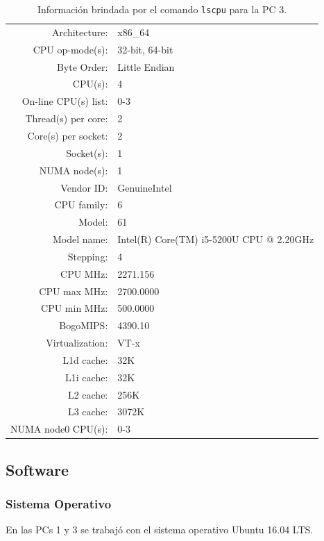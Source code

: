 \documentclass{article}
\begin{document}
\begin{description}[align=right]
        \begin{table}[H]
            \centering
            \begin{tabular}{ r l }
				Architecture:        &  x86\_64\\
				CPU op-mode(s):      &  32-bit, 64-bit\\
				Byte Order:          &  Little Endian\\
				CPU(s):              &  4\\
				On-line CPU(s) list: &  0-3\\
				Thread(s) per core:  &  2\\
				Core(s) per socket:  &  2\\
				Socket(s):           &  1\\
				NUMA node(s):        &  1\\
				Vendor ID:           &  GenuineIntel\\
				CPU family:          &  6\\
				Model:               &  61\\
				Model name:          &  Intel(R) Core(TM) i5-5200U CPU @ 2.20GHz\\
				Stepping:            &  4\\
				CPU MHz:             &  2271.156\\
				CPU max MHz:         &  2700.0000\\
				CPU min MHz:         &  500.0000\\
				BogoMIPS:            &  4390.10\\
				Virtualization:      &  VT-x\\
				L1d cache:           &  32K\\
				L1i cache:           &  32K\\
				L2 cache:            &  256K\\
				L3 cache:            &  3072K\\
				NUMA node0 CPU(s):   &  0-3\\
            \end{tabular}
            \caption{Información brindada por el comando \texttt{lscpu} para la PC 3.}
        \end{table}
\end{description}
\subsection{Software}
\subsubsection{Sistema Operativo}
En las PCs 1 y 3 se trabajó con el sistema operativo Ubuntu 16.04 LTS.
\end{document}
